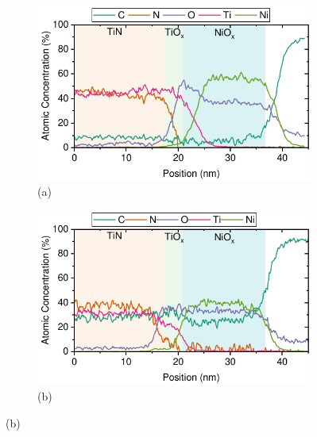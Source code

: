\begin{figure}[htbp]
    \centering
    \begin{subfigure}[t]{0.49\textwidth}
        \centering
        \includegraphics[width=\textwidth]{chapters/material_properties/images/TEM_As_Dep.pdf} %
        \caption*{(a)}
    \end{subfigure}
    \hfill
    \begin{subfigure}[t]{0.49\textwidth}
        \centering
        \includegraphics[width=\textwidth]{chapters/material_properties/images/TEM_5_min.pdf} %
        \caption*{(b)}
    \end{subfigure}

    \vspace{1em} %


\end{figure}

